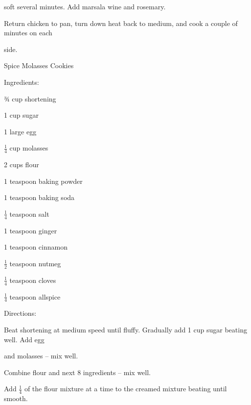 \documentclass[a4paper,portrait,12pt]{book}
\begin{document}
soft several minutes. Add marsala wine and rosemary.




Return chicken to pan, turn down heat back to medium, and cook a couple of minutes on each




side.







\newpage
Spice Molasses Cookies




Ingredients:




¾ cup shortening




1 cup sugar




1 large egg




$\frac{1}{4}$ cup molasses




2 cups flour




1 teaspoon baking powder




1 teaspoon baking soda




$\frac{1}{4}$ teaspoon salt




1 teaspoon ginger




1 teaspoon cinnamon




$\frac{1}{2}$ teaspoon nutmeg




$\frac{1}{4}$ teaspoon cloves




$\frac{1}{4}$ teaspoon allspice




Directions:




Beat shortening at medium speed until fluffy. Gradually add 1 cup sugar beating well. Add egg




and molasses -- mix well.




Combine flour and next 8 ingredients -- mix well.




Add $\frac{1}{4}$ of the flour mixture at a time to the creamed mixture beating until smooth.
\end{document}
